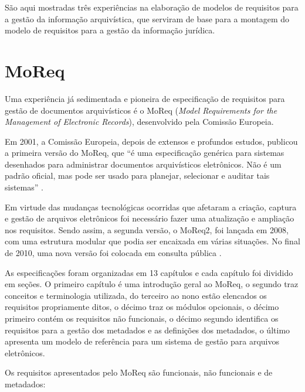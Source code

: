 \documentclass[a4paper,11pt,openright,twoside,brazil]{abntex2}
\begin{document}
São aqui mostradas três experiências na elaboração de modelos de requisitos
para a gestão da informação arquivística, que serviram de base para a montagem
do modelo de requisitos para a gestão da informação jurídica.

\section{MoReq}

Uma experiência já sedimentada e pioneira de especificação de requisitos para
gestão de documentos arquivísticos é o MoReq (\emph{Model Requirements for the
Management of Electronic Records}), desenvolvido pela Comissão Europeia.

Em 2001, a Comissão Europeia, depois de extensos e profundos estudos, publicou a
primeira versão do MoReq, que ``é uma especificação genérica para sistemas
desenhados para administrar documentos arquivísticos eletrônicos. Não é um
padrão oficial, mas pode ser usado para planejar, selecionar e auditar tais
sistemas'' \cite{piers2003}.

Em virtude das mudanças tecnológicas ocorridas que afetaram a criação, captura e
gestão de arquivos eletrônicos foi necessário fazer uma atualização e ampliação
nos requisitos. Sendo assim, a segunda versão, o MoReq2, foi lançada em 2008,
com uma estrutura modular que podia ser encaixada em várias situações. No final
de 2010, uma nova versão foi colocada em consulta pública \cite{european2008}.

As especificações foram organizadas em 13 capítulos e cada capítulo foi dividido
em seções. O primeiro capítulo é uma introdução geral ao MoReq, o segundo traz
conceitos e terminologia utilizada, do terceiro ao nono estão elencados os
requisitos propriamente ditos, o décimo traz os módulos opcionais, o décimo
primeiro contém os requisitos não funcionais, o décimo segundo identifica os
requisitos para a gestão dos metadados e as definições dos metadados, o último
apresenta um modelo de referência para um sistema de gestão para arquivos
eletrônicos.

Os requisitos apresentados pelo MoReq são funcionais, não funcionais e de
metadados:
\end{document}

